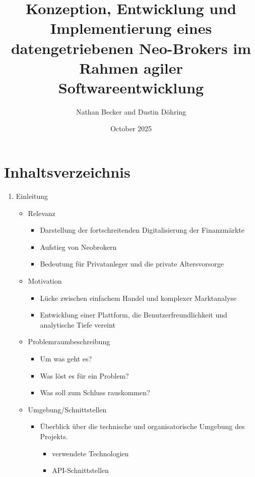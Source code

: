 \documentclass{article}
\author{Nathan Becker and Dustin Döhring}
\date{October 2025}
\begin{document}
\title{Konzeption, Entwicklung und Implementierung eines datengetriebenen Neo-Brokers im Rahmen agiler Softwareentwicklung}
\maketitle
\newpage
\section{Inhaltsverzeichnis}
\begin{enumerate}
    \item Einleitung
    \begin{itemize}
      \item Relevanz
            \begin{itemize}
        \item Darstellung der fortschreitenden Digitalisierung der Finanzmärkte
        \item Aufstieg von Neobrokern
        \item Bedeutung für Privatanleger und die private Altersvorsorge
        \end{itemize}
        \item Motivation 
        \begin{itemize}
        \item Lücke zwischen einfachem Handel und komplexer Marktanalyse
        \item Entwicklung einer Plattform, die Benutzerfreundlichkeit und analytische Tiefe vereint
        \end{itemize}
            \item Problemraumbeschreibung
        \begin{itemize}
        \item Um was geht es?
        \item Was löst es für ein Problem?
        \item  Was soll zum Schluss rauskommen?
        \end{itemize}
      \item Umgebung/Schnittstellen 
      \begin{itemize}
        \item Überblick über die technische und organisatorische Umgebung des Projekts.
        \begin{itemize}
        \item verwendete Technologien
        \item  API-Schnittstellen
        \begin{itemize}

\end{itemize}
\end{itemize}
\end{itemize}
\end{itemize}
\end{enumerate}
\end{document}
